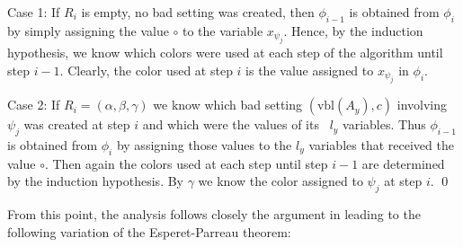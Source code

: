 \documentclass[11pt]{amsart}
\numberwithin{equation}{section}
\begin{document}
Case 1: If $R_i$ is empty, no bad setting was created, then $\phi_{i-1}$ is obtained from $\phi_i$ by simply assigning the value $\circ$ to the variable $x_{\psi_j}$. Hence, by the induction hypothesis, we know which colors were used at each step of the algorithm until step $i-1$. Clearly, the color used at step $i$ is the value assigned to $x_{\psi_j}$ in $\phi_i$. 

Case 2: If $R_i = (\alpha, \beta, \gamma)$ we know which bad setting $(\text{vbl}(A_y),c)$ involving $\psi_j$ was created at step $i$ and which were the values of its~ $l_y$ variables. Thus $\phi_{i-1}$ is obtained from $\phi_i$ by assigning those values to the $l_y$ variables that received the value $\circ$. Then again the colors used at each step until step $i-1$ are determined by the induction hypothesis. By $\gamma$ we know the color assigned to $\psi_j$ at step $i$. \qed

\medskip



From this point, the analysis follows closely the argument in \cite{Entropy Compression} leading to the following variation of the Esperet-Parreau theorem:
\end{document}

